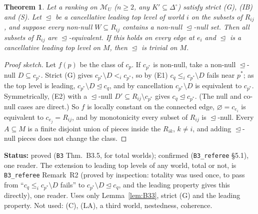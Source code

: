 \documentclass[11pt]{article}
\newtheorem{theorem}{Theorem}[section]
\theoremstyle{definition}
\theoremstyle{remark}
\newcommand{\Di}{\Delta^{\circ}}
\newcommand{\M}{\mathcal M}
\newcommand{\src}[1]{\texttt{#1}}
\newcommand{\status}[1]{\par\smallskip\noindent\textbf{Status:} #1\par\smallskip}
\begin{document}
\begin{theorem}\label{thm:B35}
Let a ranking on $\M_U$ ($n\ge2$, any $K'\subseteq\Di$) satisfy strict (G), (IB) and (S). Let $\trianglelefteq$ be a cancellative leading top level of world $i$ on the subsets of $R_{ij}$, and suppose every non-null $W\subseteq R_{ij}$ contains a non-null $\trianglelefteq$-null set. Then all subsets of $R_{ij}$ are $\trianglelefteq$-equivalent. If this holds on every edge at $e_i$ and $\trianglelefteq$ is a cancellative leading top level on $M$, then $\trianglelefteq$ is trivial on $M$.
\end{theorem}
\begin{proof}[Proof sketch]
Let $f(p)$ be the class of $c_p$. If $c_{p^*}$ is non-null, take a non-null $\trianglelefteq$-null $D\subseteq c_{p^*}$. Strict (G) gives $c_{p^*}\setminus D<_ic_{p^*}$, so by (E1) $c_q\le_ic_{p^*}\setminus D$ fails near $p^*$; as the top level is leading, $c_{p^*}\setminus D\trianglelefteq c_q$, and by cancellation $c_{p^*}\setminus D$ is equivalent to $c_{p^*}$. Symmetrically, (E2) with a $\trianglelefteq$-null $D'\subseteq R_{ij}\setminus c_{p^*}$ gives $c_q\trianglelefteq c_{p^*}$. (The null and co-null cases are direct.) So $f$ is locally constant on the connected edge, $\varnothing=c_{e_i}$ is equivalent to $c_{e_j}=R_{ij}$, and by monotonicity every subset of $R_{ij}$ is $\trianglelefteq$-null. Every $A\subseteq M$ is a finite disjoint union of pieces inside the $R_{ik}$, $k\ne i$, and adding $\trianglelefteq$-null pieces does not change the class.
\end{proof}
\status{proved (\src{B3} Thm.~B3.5, for total worlds); confirmed (\src{B3\_referee} \S5.1), one reader. The extension to leading top levels of any world, total or not, is \src{B3\_referee} Remark~R2 (proved by inspection: totality was used once, to pass from ``$c_q\le_ic_{p^*}\setminus D$ fails'' to $c_{p^*}\setminus D\trianglelefteq c_q$, and the leading property gives this directly), one reader. Uses only Lemma~\ref{lem:B33}, strict (G) and the leading property. Not used: (C), (LA), a third world, nestedness, coherence.}
\end{document}

